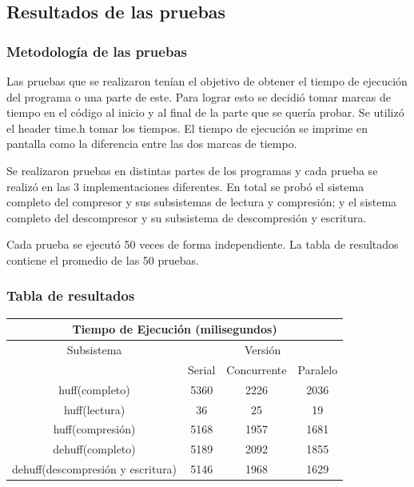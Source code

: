 \documentclass{report}
\begin{document}
\subsection{Resultados de las pruebas}
\subsubsection{Metodología de las pruebas}

Las pruebas que se realizaron tenían el objetivo de obtener el tiempo de ejecución del programa o una parte de este. Para lograr esto se decidió tomar marcas de tiempo en el código al inicio y al final de la parte que se quería probar. Se utilizó el header time.h tomar los tiempos. El tiempo de ejecución  se imprime en pantalla como la diferencia entre las dos marcas de tiempo.

Se realizaron pruebas en distintas partes de los programas y cada prueba se realizó en las 3 implementaciones diferentes. En total se probó el sistema completo del compresor y sus subsistemas de lectura y compresión; y el sistema completo del descompresor y su subsistema de descompresión y escritura.

Cada prueba se ejecutó 50 veces de forma independiente. La tabla de resultados contiene el promedio de las 50 pruebas.

\subsubsection{Tabla de resultados}

\begin{center}
	\begin{tabular}{|c|c|c|c|}		
		
\hline
\multicolumn{4}{|c|}{Tiempo de Ejecución (milisegundos)} \\
\hline
 Subsistema& \multicolumn{3}{|c|}{Versión} \\
 \hline
 & Serial & Concurrente & Paralelo\\
 \hline
huff(completo) & 5360& 2226 & 2036\\
 \hline
huff(lectura) &  36 & 25 & 19\\
 \hline
 huff(compresión) &  5168 & 1957 & 1681\\
 \hline
 dehuff(completo) & 5189 & 2092 & 1855\\
 \hline
 dehuff(descompresión y escritura) & 5146 & 1968 & 1629\\
 \hline
 
	\end{tabular}
\end{center}
\end{document}
